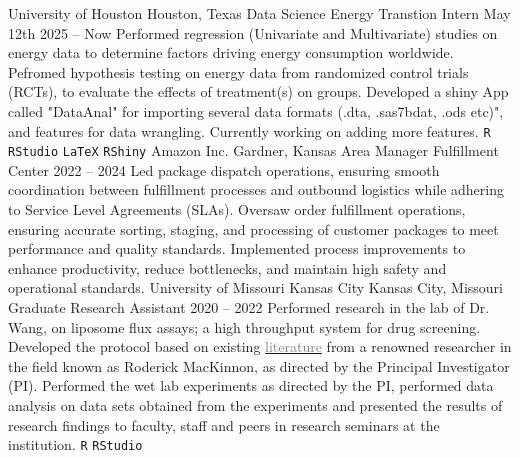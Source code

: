\documentclass[9pt]{adeckcv} %
\begin{document}

\begin{entrylist}
    \entry
        {\large{University of Houston}} 
        {Houston, Texas}
        {\large{Data Science Energy Transtion Intern}}
        {May 12th 2025 -- Now}
        {\itemizeexperience
        {Performed regression (Univariate and Multivariate) studies on energy data to determine factors driving energy consumption worldwide.}
        {Pefromed hypothesis testing on energy data from randomized control trials (RCTs), to evaluate the effects of treatment(s) on groups.}
{Developed a shiny App called "DataAnal" for importing several data formats (.dta, .sas7bdat, .ods etc)", and features for data wrangling. Currently working on adding more features.}
\texttt{R}\slashsep
\texttt{RStudio}\slashsep
\faMarkdown\slashsep
\texttt{LaTeX}\slashsep
\texttt{RShiny}\slashsep
\faWindows\slashsep 
\faLinux\slashsep
}
\entry
{\large{Amazon Inc.}}
{Gardner, Kansas}
{\large{Area Manager Fulfillment Center}}
{2022 -- 2024}
{\itemizeexperience
  {Led package dispatch operations, ensuring smooth coordination between fulfillment processes and outbound logistics while adhering to Service Level Agreements (SLAs).}
  {Oversaw order fulfillment operations, ensuring accurate sorting, staging, and processing of customer packages to meet performance and quality standards.}
  {Implemented process improvements to enhance productivity, reduce bottlenecks, and maintain high safety and operational standards.}
  \faAmazon\slashsep
  \faWarehouse
}
\entry
{\large{University of Missouri Kansas City}}
{Kansas City, Missouri}
{\large{Graduate Research Assistant}}
{2020 -- 2022}
{\itemizeexperience
  {Performed research in the lab of Dr. Wang, on liposome flux assays; a high throughput system for drug screening. }
  {Developed the protocol based on existing \href{https://www.pnas.org/doi/10.1073/pnas.1602815113}{\textcolor{gray}{literature}} from a renowned researcher in the field known as Roderick MacKinnon, as directed by the Principal Investigator (PI).}
  {Performed the wet lab experiments as directed by the PI, performed data analysis on data sets obtained from the experiments and presented the results of research findings to faculty, staff and peers in research seminars at the institution.}
  \texttt{R}\slashsep
  \texttt{RStudio}\slashsep
  \faDna\slashsep
  \faSlideshare
}
\end{entrylist}
\end{document}
